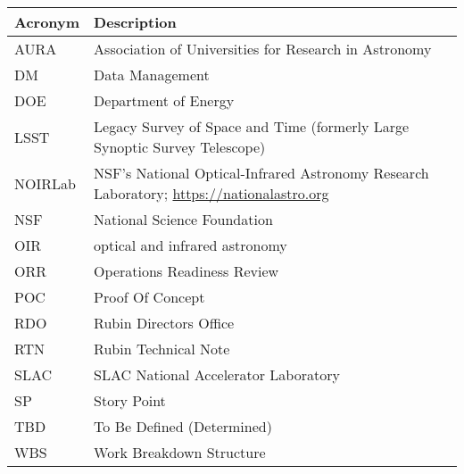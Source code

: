 \addtocounter{table}{-1}
\begin{longtable}{p{}p{}}\hline
\textbf{Acronym} & \textbf{Description}  \\\hline

AURA & Association of Universities for Research in Astronomy \\\hline
DM & Data Management \\\hline
DOE & Department of Energy \\\hline
LSST & Legacy Survey of Space and Time (formerly Large Synoptic Survey Telescope) \\\hline
NOIRLab & NSF's National Optical-Infrared Astronomy Research Laboratory; \url{https://nationalastro.org} \\\hline
NSF & National Science Foundation \\\hline
OIR & optical and infrared astronomy \\\hline
ORR & Operations Readiness Review \\\hline
POC & Proof Of Concept \\\hline
RDO & Rubin Directors Office \\\hline
RTN & Rubin Technical Note \\\hline
SLAC & SLAC National Accelerator Laboratory \\\hline
SP & Story Point \\\hline
TBD & To Be Defined (Determined) \\\hline
WBS & Work Breakdown Structure \\\hline
\end{longtable}
